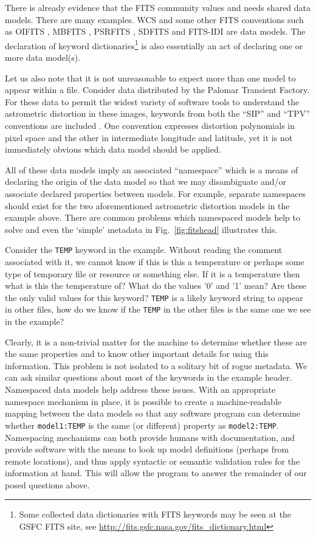 \documentclass[final,authoryear,5p,times,twocolumn]{elsarticle}
\begin{document}
{{There is already evidence that the FITS community values and needs shared
data models. There are many examples. WCS and some other FITS conventions
such as OIFITS
\citep{2006SPIE.6268E.106T}, MBFITS \citep{2006A&A...454L..25M},
PSRFITS \citep{2004PASA...21..302H},
SDFITS \citep{2000ASPC..216..243G} and FITS-IDI \citep{2011AIPS114}
are data models. The declaration of keyword
dictionaries\footnote{Some collected data dictionaries with FITS
keywords may be seen at the GSFC FITS site, see
\url{http://fits.gsfc.nasa.gov/fits\_dictionary.html}} is also essentially
an act of declaring one or more data model(s).

Let us also note that it is not unreasonable to expect more than one model
to appear within a file. Consider data distributed by the Palomar Transient
Factory.  For these data to permit the widest
variety of software tools to understand the astrometric distortion in these
images, keywords from both the ``SIP'' and ``TPV'' conventions are included
\citep{2012SPIE.8451E..1MS}.
One convention expresses distortion polynomials in pixel space and the
other in intermediate longitude and latitude, yet it is not immediately
obvious which data model should be applied.


All of these data models imply an associated ``namespace'' which is
a means of declaring the origin of the data model so that we may
disambiguate and/or associate declared properties between models.
For example, separate namespaces should exist for the two aforementioned
astrometric distortion models in the example above.
There are common problems which name\-spaced models help to solve and even
the `simple' metadata in Fig.~\ref{fig:fitshead} illustrates this.


Consider the \texttt{TEMP} keyword in the example. Without reading the comment
associated with it, we cannot know if this is this a temperature or perhaps
some type of temporary file or resource or something else. If it is a
temperature then what is this the temperature of? What do the values '0'
and '1' mean? Are these the only valid values for this keyword?  \texttt{TEMP} is
a likely keyword string to appear in other files, how do we know if the
\texttt{TEMP} in the other files is the same one we see in the example?


Clearly, it is a non-trivial matter for the machine to determine whether
these are the same properties and to know other important details for using
this information. This problem is not isolated to a solitary bit
of rogue metadata. We can ask similar questions about most of the keywords
in the example header. Namespaced data models help address these issues. With
an appropriate namespace mechanism in place, it is possible to create a
machine-readable mapping between the data models so that any software program
can determine whether \texttt{model1:TEMP} is the same (or different) property as
\texttt{model2:TEMP}.
Namespacing mechanisms can both provide humans with documentation, and
provide software with the means to look up model definitions (perhaps from
remote locations), and thus apply syntactic or semantic validation rules
for the information at hand.  This will allow the program to
answer the remainder of our posed questions above.


}}
\end{document}
